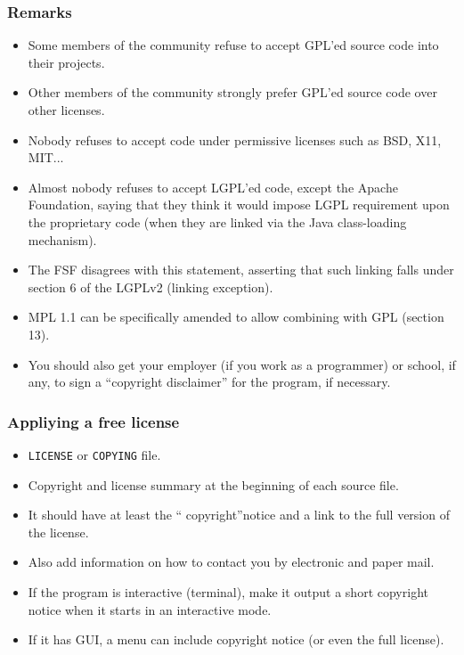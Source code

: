 \begin{frame}
\frametitle{Remarks}

\small

\begin{itemize}
\item Some members of the community refuse to accept GPL'ed source code into their projects.
\item Other members of the community strongly prefer GPL'ed source code over other licenses.
\item Nobody refuses to accept code under permissive licenses such as BSD, X11, MIT... 
\item Almost nobody refuses to accept LGPL'ed code, except the Apache Foundation, saying that they think it would impose LGPL requirement upon the proprietary code (when they are linked via the Java class-loading mechanism).
\item The FSF disagrees with this statement, asserting that such linking falls under section 6 of the LGPLv2 (linking exception).
\item MPL 1.1 can be specifically amended to allow combining with GPL (section 13).
\item You should also get your employer (if you work as a programmer) or school, if any, to sign a ``copyright disclaimer'' for the program, if necessary. 
\end{itemize}

\end{frame}





\begin{frame}
\frametitle{Appliying a free license}


\begin{itemize}
\item \texttt{LICENSE} or \texttt{COPYING} file.
\item Copyright and license summary at the beginning of each source file.
\item It should have at least the `` copyright''notice and a link to the full version of the license.
\item Also add information on how to contact you by electronic and paper mail.
\item If the program is interactive (terminal), make it output a short copyright notice 
when it starts in an interactive mode.
\item If it has GUI, a menu can include copyright notice (or even the full license).
\end{itemize}

\end{frame}

